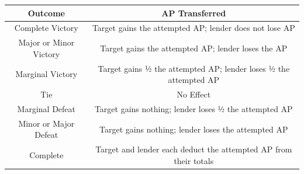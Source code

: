\documentclass[
]{article}
\begin{document}
\begin{longtable}[]{@{}cc@{}}
\toprule
\begin{minipage}[b]{0.24\columnwidth}\centering
Outcome\strut
\end{minipage} & \begin{minipage}[b]{0.70\columnwidth}\centering
AP Transferred\strut
\end{minipage}\tabularnewline
\midrule
\endhead
\begin{minipage}[t]{0.24\columnwidth}\centering
Complete Victory\strut
\end{minipage} & \begin{minipage}[t]{0.70\columnwidth}\centering
Target gains the attempted AP; lender does not lose AP\strut
\end{minipage}\tabularnewline
\begin{minipage}[t]{0.24\columnwidth}\centering
Major or Minor Victory\strut
\end{minipage} & \begin{minipage}[t]{0.70\columnwidth}\centering
Target gains the attempted AP; lender loses the AP\strut
\end{minipage}\tabularnewline
\begin{minipage}[t]{0.24\columnwidth}\centering
Marginal Victory\strut
\end{minipage} & \begin{minipage}[t]{0.70\columnwidth}\centering
Target gains ½ the attempted AP; lender loses ½ the attempted AP\strut
\end{minipage}\tabularnewline
\begin{minipage}[t]{0.24\columnwidth}\centering
Tie\strut
\end{minipage} & \begin{minipage}[t]{0.70\columnwidth}\centering
No Effect\strut
\end{minipage}\tabularnewline
\begin{minipage}[t]{0.24\columnwidth}\centering
Marginal Defeat\strut
\end{minipage} & \begin{minipage}[t]{0.70\columnwidth}\centering
Target gains nothing; lender loses ½ the attempted AP\strut
\end{minipage}\tabularnewline
\begin{minipage}[t]{0.24\columnwidth}\centering
Minor or Major Defeat\strut
\end{minipage} & \begin{minipage}[t]{0.70\columnwidth}\centering
Target gains nothing; lender loses the attempted AP\strut
\end{minipage}\tabularnewline
\begin{minipage}[t]{0.24\columnwidth}\centering
Complete\strut
\end{minipage} & \begin{minipage}[t]{0.70\columnwidth}\centering
Target and lender each deduct the attempted AP from their totals\strut
\end{minipage}\tabularnewline
\bottomrule
\end{longtable}
\end{document}
